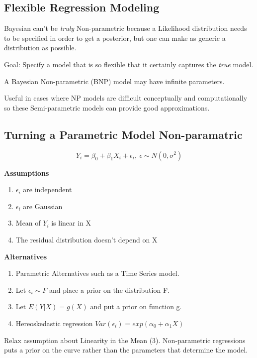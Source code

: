 \documentclass[11pt]{article}
\begin{document}
\subsection{Flexible Regression Modeling}
\label{sec:org973a723}

Bayesian can't be \emph{truly} Non-parametric because a Likelihood distribution needs to
be specified in order to get a posterior, but one can make as generic a distribution as possible.

Goal: Specify a model that is so flexible that it certainly captures the \emph{true}
model.

A Bayesian Non-parametric (BNP) model may have infinite parameters.

Useful in cases where NP models are difficult conceptually and computationally
so these Semi-parametric models can provide good approximations.

\subsection{Turning a Parametric Model Non-paramatric}
\label{sec:orgb887ac3}

$$
Y_i = \beta_0 + \beta_1 X_i + \epsilon_i, \ \epsilon \sim N(0, \sigma^2)
$$

\textbf{Assumptions}

\begin{enumerate}
\item \(\epsilon_i\) are independent
\item \(\epsilon_i\) are Gaussian
\item Mean of \(Y_i\) is linear in X
\item The residual distribution doesn't depend on X
\end{enumerate}

\textbf{Alternatives}

\begin{enumerate}
\item Parametric Alternatives such as a Time Series model.
\item Let \(\epsilon_i \sim F\) and place a prior on the distribution F.
\item Let \(E(Y | X) = g(X)\) and put a prior on function g.
\item Hereoskedastic regression \(Var(\epsilon_i) = exp(\alpha_0 + \alpha_1 X)\)
\end{enumerate}


Relax assumption about Linearity in the Mean (3). Non-parametric regressions
puts a prior on the curve rather than the parameters that determine the model.
\end{document}
